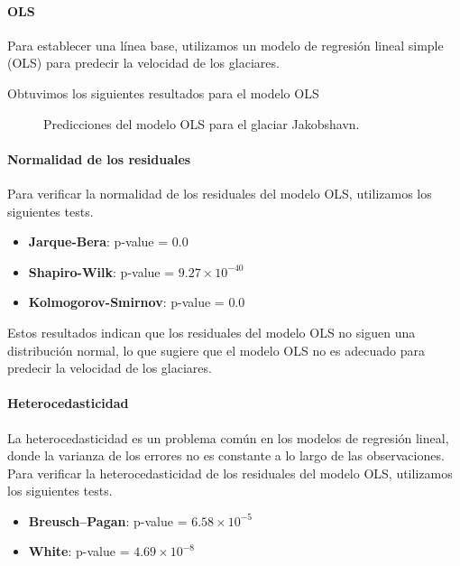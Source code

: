 \documentclass[sigconf,authordraft,language=spanish]{acmart}
\begin{document}
\paragraph{OLS}

Para establecer una línea base, utilizamos un modelo de regresión lineal simple (OLS) para predecir la velocidad de los glaciares.

Obtuvimos los siguientes resultados para el modelo OLS

\begin{figure}[htbp]
   \centering
   
    \caption{Predicciones del modelo OLS para el glaciar Jakobshavn.}
    \label{fig:jakobshavn_ols}
\end{figure}

\paragraph{Normalidad de los residuales}

Para verificar la normalidad de los residuales del modelo OLS, utilizamos los siguientes tests.
\begin{itemize}
  \item \textbf{Jarque-Bera}: p-value = $0.0$
  \item \textbf{Shapiro-Wilk}: p-value = $9.27 \times 10^{-40}$
  \item \textbf{Kolmogorov-Smirnov}: p-value = $0.0$
\end{itemize}

Estos resultados indican que los residuales del modelo OLS no siguen una distribución normal, lo que sugiere que el modelo OLS no es adecuado para predecir la velocidad de los glaciares.

\paragraph{Heterocedasticidad}

La heterocedasticidad es un problema común en los modelos de regresión lineal, donde la varianza de los errores no es constante a lo largo de las observaciones.
Para verificar la heterocedasticidad de los residuales del modelo OLS, utilizamos los siguientes tests.

\begin{itemize}
  \item \textbf{Breusch–Pagan}: p-value = $6.58 \times 10^{-5}$
  \item \textbf{White}: p-value = $4.69 \times 10^{-8}$
\end{itemize}
\end{document}
